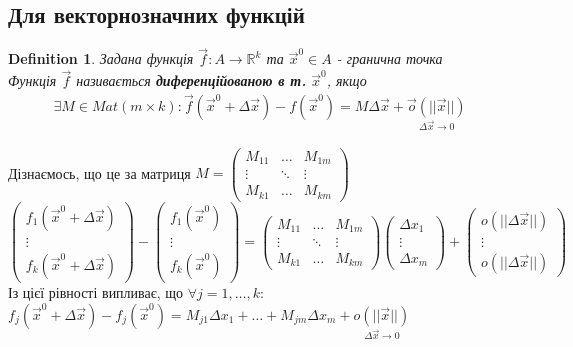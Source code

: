 \documentclass[a4paper, 14pt]{extarticle}
\theoremstyle{theoremdd}
\theoremstyle{theoremdd}
\newtheorem{definition}[theorem]{Definition}
\theoremstyle{theoremdd}
\theoremstyle{theoremdd}
\theoremstyle{theoremdd}
\theoremstyle{theoremdd}
\theoremstyle{theoremdd}
\theoremstyle{theoremdd}
\begin{document}
\subsection{Для векторнозначних функцій}
\begin{definition}
Задана функція $\vec{f}: A \to \mathbb{R}^k$ та $\vec{x}^0 \in A$ - гранична точка\\
Функція $\vec{f}$ називається \textbf{диференційованою в т.} $\vec{x}^0$, якщо
\begin{align*}
\exists M \in Mat(m \times k): \vec{f}(\vec{x}^0 + \Delta \vec{x}) - f(\vec{x}^0) = M \Delta \vec{x} + \underset{\Delta \vec{x} \to 0}{\vec{o}(||\vec{x}||)}
\end{align*}
\end{definition}
Дізнаємось, що це за матриця $M = \begin{pmatrix}
M_{11} & \dots & M_{1m} \\
\vdots & \ddots & \vdots \\
M_{k1} & \dots & M_{km}
\end{pmatrix}$\\
$\begin{pmatrix}
f_1(\vec{x}^0 + \Delta \vec{x}) \\ \vdots \\ f_k(\vec{x}^0 + \Delta \vec{x})
\end{pmatrix} - \begin{pmatrix}
f_1(\vec{x}^0) \\ \vdots \\ f_k(\vec{x}^0)
\end{pmatrix} = \begin{pmatrix}
M_{11} & \dots & M_{1m} \\
\vdots & \ddots & \vdots \\
M_{k1} & \dots & M_{km}
\end{pmatrix} \begin{pmatrix}
\Delta x_1 \\ \vdots \\ \Delta x_m
\end{pmatrix} + \begin{pmatrix}
o(||\Delta \vec{x}||) \\ \vdots \\ o(||\Delta \vec{x}||)
\end{pmatrix}$\\
Із цієї рівності випливає, що $\forall j = 1,\dots,k:$\\
$f_j(\vec{x}^0 + \Delta \vec{x}) - f_j(\vec{x}^0) = M_{j1} \Delta x_1 + \dots + M_{jm} \Delta x_m + \underset{\Delta \vec{x} \to 0}{o(||\vec{x}||)}$\\
\end{document}
